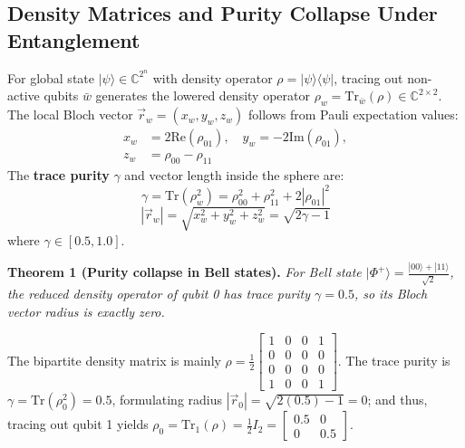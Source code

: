 \documentclass[conference]{IEEEtran}
\begin{document}
\subsection{Density Matrices and Purity Collapse Under Entanglement}
For global state $|\psi\rangle \in \mathbb{C}^{2^n}$ with density operator $\rho = |\psi\rangle\langle\psi|$, tracing out non-active qubits $\bar{w}$ generates the lowered density operator $\rho_w = \text{Tr}_{\bar{w}}(\rho) \in \mathbb{C}^{2 \times 2}$. The local Bloch vector $\vec{r}_w = (x_w, y_w, z_w)$ follows from Pauli expectation values:
\begin{equation}
\begin{aligned}
x_w &= 2\text{Re}(\rho_{01}), \quad y_w = -2\text{Im}(\rho_{01}), \\
z_w &= \rho_{00} - \rho_{11}
\end{aligned}
\end{equation}
The \textbf{trace purity} $\gamma$ and vector length inside the sphere are:
\begin{equation}
\gamma = \text{Tr}(\rho_w^2) = \rho_{00}^2 + \rho_{11}^2 + 2|\rho_{01}|^2
\end{equation}
\begin{equation}
|\vec{r}_w| = \sqrt{x_w^2 + y_w^2 + z_w^2} = \sqrt{2\gamma - 1}
\end{equation}
where $\gamma \in [0.5, 1.0]$.

\noindent\textbf{Theorem 1 (Purity collapse in Bell states).} \textit{For Bell state $|\Phi^+\rangle = \frac{|00\rangle + |11\rangle}{\sqrt{2}}$, the reduced density operator of qubit 0 has trace purity $\gamma = 0.5$, so its Bloch vector radius is exactly zero.}

\begin{IEEEproof}
The bipartite density matrix is mainly $\rho = \frac{1}{2}\left[\begin{smallmatrix} 1 & 0 & 0 & 1 \\ 0 & 0 & 0 & 0 \\ 0 & 0 & 0 & 0 \\ 1 & 0 & 0 & 1 \end{smallmatrix}\right]$. The trace purity is $\gamma = \text{Tr}(\rho_0^2) = 0.5$, formulating radius $|\vec{r}_0| = \sqrt{2(0.5) - 1} = 0$; and thus, tracing out qubit 1 yields $\rho_0 = \text{Tr}_1(\rho) = \frac{1}{2}I_2 = \left[\begin{smallmatrix} 0.5 & 0 \\ 0 & 0.5 \end{smallmatrix}\right]$.
\end{IEEEproof}
\end{document}
